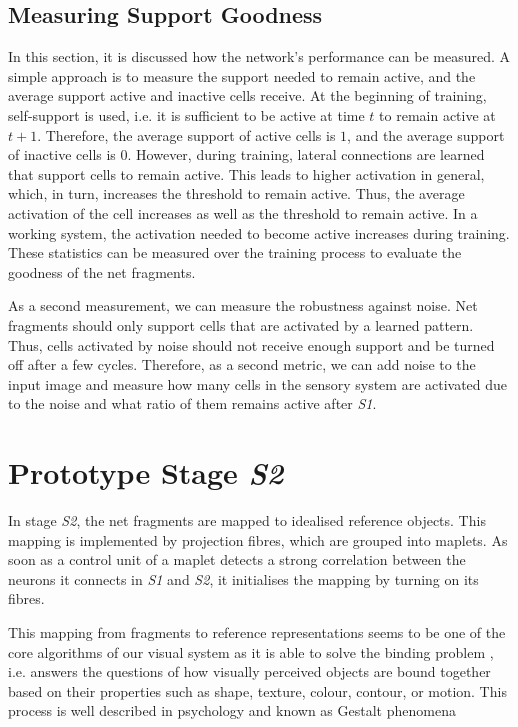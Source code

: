 \subsection{Measuring Support Goodness}
In this section, it is discussed how the network's performance can be measured.
A simple approach is to measure the support needed to remain active, and the average support active and inactive cells receive.
At the beginning of training, self-support is used, i.e. it is sufficient to be active at time $t$ to remain active at $t+1$.
Therefore, the average support of active cells is $1$, and the average support of inactive cells is $0$.
However, during training, lateral connections are learned that support cells to remain active.
This leads to higher activation in general, which, in turn, increases the threshold to remain active.
Thus, the average activation of the cell increases as well as the threshold to remain active.
In a working system, the activation needed to become active increases during training.
These statistics can be measured over the training process to evaluate the goodness of the net fragments.

As a second measurement, we can measure the robustness against noise.
Net fragments should only support cells that are activated by a learned pattern. Thus, cells activated by noise should not receive enough support and be turned off after a few cycles.
Therefore, as a second metric, we can add noise to the input image and measure how many cells in the sensory system are activated due to the noise and what ratio of them remains active after \emph{S1}.









\section{Prototype Stage \emph{S2}}
In stage \emph{S2}, the net fragments are mapped to idealised reference objects.
This mapping is implemented by projection fibres, which are grouped into maplets.
As soon as a control unit of a maplet detects a strong correlation between the neurons it connects in \emph{S1} and \emph{S2}, it initialises the mapping by turning on its fibres.

This mapping from fragments to reference representations seems to be one of the core algorithms of our visual system as it is able to solve the binding problem , i.e. answers the questions of how visually perceived objects are bound together based on their properties such as shape, texture, colour, contour, or motion. This process is well described in psychology and known as Gestalt phenomena 

